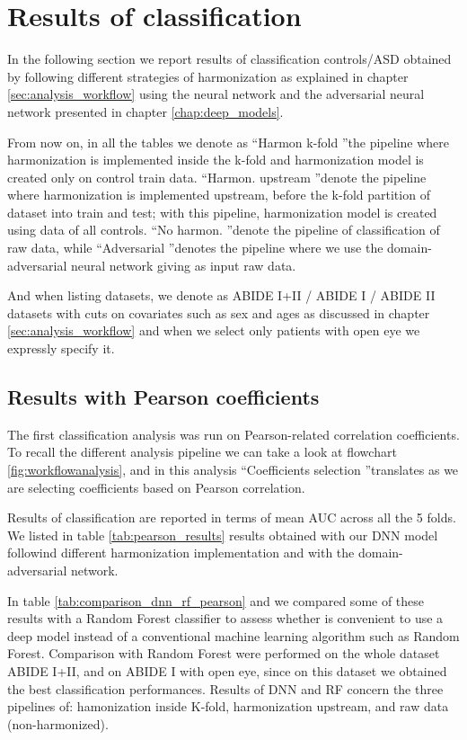 \documentclass[11pt]{report}
\begin{document}
\newpage
\chapter{Results of classification} \label{chap:results_deeplearning}
In the following section we report results of classification controls/ASD obtained by following different strategies of harmonization as explained in chapter \ref{sec:analysis_workflow} using the neural network and the adversarial neural network presented in chapter \ref{chap:deep_models}.

From now on, in all the tables we denote as \textquotedblleft Harmon k-fold \textquotedblright the pipeline where harmonization is implemented inside the k-fold and harmonization model is created only on control train data. \textquotedblleft Harmon. upstream \textquotedblright denote the pipeline where harmonization is implemented upstream, before the k-fold partition of dataset into train and test; with this pipeline, harmonization model is created using data of all controls.  \textquotedblleft No harmon. \textquotedblright denote the pipeline of classification of raw data, while  \textquotedblleft Adversarial \textquotedblright denotes the pipeline where we use the domain-adversarial neural network giving as input raw data.

And when listing datasets, we denote as ABIDE I+II / ABIDE I / ABIDE II datasets with cuts on covariates such as sex and ages as discussed in chapter \ref{sec:analysis_workflow} and when we select only patients with open eye we expressly specify it.

\section{Results with Pearson coefficients}\label{sec:pearson_results}
The first classification analysis was run on Pearson-related correlation coefficients. To recall the different analysis pipeline we can take a look at flowchart \ref{fig:workflowanalysis}, and in this analysis \textquotedblleft Coefficients selection \textquotedblright  translates as we are selecting coefficients based on Pearson correlation.

Results of classification are reported in terms of mean AUC across all the 5 folds.
We listed in table \ref{tab:pearson_results} results obtained with our DNN model followind different harmonization implementation and with the domain-adversarial network.

In table \ref{tab:comparison_dnn_rf_pearson} and we compared some of these results with a Random Forest classifier to assess whether is convenient to use a deep model instead of a conventional machine learning algorithm such as Random Forest.
Comparison with Random Forest were performed on the whole dataset ABIDE I+II, and on ABIDE I with open eye, since on this dataset we obtained the best classification performances. Results of DNN and RF concern the three pipelines of: hamonization inside K-fold, harmonization upstream, and raw data (non-harmonized).
\end{document}
